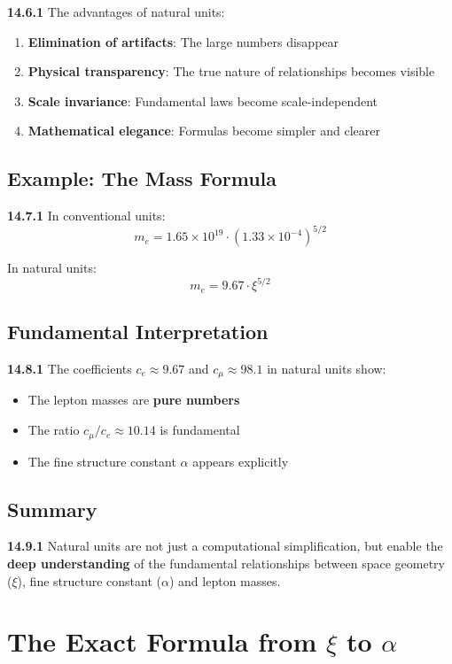 \documentclass[12pt,a4paper]{article}
\begin{document}
\noindent \textbf{14.6.1} The advantages of natural units:
\begin{enumerate}
	\item \textbf{Elimination of artifacts}: The large numbers disappear
	\item \textbf{Physical transparency}: The true nature of relationships becomes visible
	\item \textbf{Scale invariance}: Fundamental laws become scale-independent
	\item \textbf{Mathematical elegance}: Formulas become simpler and clearer
\end{enumerate}

\subsection{Example: The Mass Formula}

\noindent \textbf{14.7.1} In conventional units:
\[
m_e = 1.65 \times 10^{19} \cdot (1.33 \times 10^{-4})^{5/2}
\]

In natural units:
\[
m_e = 9.67 \cdot \xi^{5/2}
\]

\subsection{Fundamental Interpretation}

\noindent \textbf{14.8.1} The coefficients $c_e \approx 9.67$ and $c_\mu \approx 98.1$ in natural units show:

\begin{itemize}
	\item The lepton masses are \textbf{pure numbers}
	\item The ratio $c_\mu/c_e \approx 10.14$ is fundamental
	\item The fine structure constant $\alpha$ appears explicitly
\end{itemize}

\subsection{Summary}

\noindent \textbf{14.9.1} Natural units are not just a computational simplification, but enable the \textbf{deep understanding} of the fundamental relationships between space geometry ($\xi$), fine structure constant ($\alpha$) and lepton masses.


\section{The Exact Formula from $\xi$ to $\alpha$}
\end{document}

